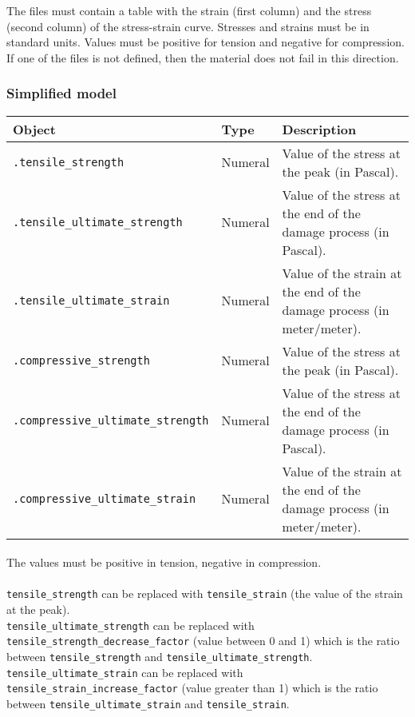 \documentclass[10pt]{article}
\begin{document}
The files must contain a table with the strain (first column) and the stress (second column) of the stress-strain curve. Stresses and strains must be in standard units. Values must be positive for tension and negative for compression. If one of the files is not defined, then the material does not fail in this direction.

\subsubsection*{Simplified model}

\begin{tabularx}{\textwidth}{llX}
\hline 
Object & Type & Description \\ 
\hline 
\verb+.tensile_strength+ & Numeral & Value of the stress at the peak (in Pascal).\\
\verb+.tensile_ultimate_strength+ & Numeral & Value of the stress at the end of the damage process (in Pascal).\\
\verb+.tensile_ultimate_strain+ & Numeral & Value of the strain at the end of the damage process (in meter/meter).\\
\verb+.compressive_strength+ & Numeral & Value of the stress at the peak (in Pascal).\\
\verb+.compressive_ultimate_strength+ & Numeral & Value of the stress at the end of the damage process (in Pascal).\\
\verb+.compressive_ultimate_strain+ & Numeral & Value of the strain at the end of the damage process (in meter/meter).\\
\hline 
\end{tabularx}

\paragraph{} The values must be positive in tension, negative in compression.

\paragraph{} \verb+tensile_strength+ can be replaced with \verb+tensile_strain+ (the value of the strain at the peak).\\ \verb+tensile_ultimate_strength+ can be replaced with \verb+tensile_strength_decrease_factor+ (value between 0 and 1) which is the ratio between \verb+tensile_strength+ and \verb+tensile_ultimate_strength+. \\\verb+tensile_ultimate_strain+ can be replaced with \verb+tensile_strain_increase_factor+ (value greater than 1) which is the ratio between \verb+tensile_ultimate_strain+ and \verb+tensile_strain+.
\end{document}
